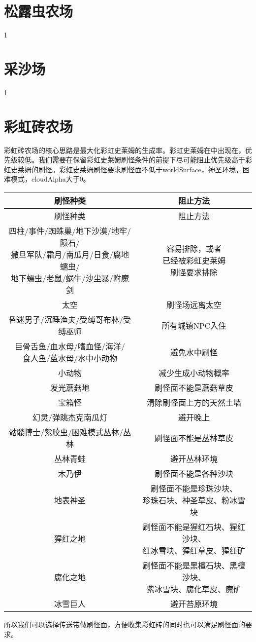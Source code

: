\section{松露虫农场}
1

\section{采沙场}
1

\section{彩虹砖农场}
彩虹砖农场的核心思路是最大化彩虹史莱姆的生成率。彩虹史莱姆在中出现在，优先级较低。我们需要在保留彩虹史莱姆刷怪条件的前提下尽可能阻止优先级高于彩虹史莱姆的刷怪。彩虹史莱姆刷怪要求刷怪面不低于worldSurface，神圣环境，困难模式，cloudAlpha大于0。
\begin{longtable}{|c|c|}
\hline
刷怪种类&阻止方法\\\hline
\endfirsthead
\hline
刷怪种类&阻止方法\\\hline
\endhead
\hline
\endfoot
\makecell{四柱/事件/蜘蛛巢/地下沙漠/地牢/陨石/\\ 撒旦军队/霜月/南瓜月/日食/腐地蠕虫/\\ 地下蠕虫/老鼠/蜗牛/沙尘暴/附魔剑}&\makecell{容易排除，或者\\ 已经被彩虹史莱姆\\ 刷怪要求排除}\\\hline
太空&刷怪场远离太空\\\hline
昏迷男子/沉睡渔夫/受缚哥布林/受缚巫师&所有城镇NPC入住\\\hline
\makecell{巨骨舌鱼/血水母/嗜血怪/海洋/\\ 食人鱼/蓝水母/水中小动物}&避免水中刷怪\\\hline
小动物&减少生成小动物概率\\\hline
发光蘑菇地&刷怪面不能是蘑菇草皮\\\hline
宝箱怪&清除刷怪面上方的天然土墙\\\hline
幻灵/弹跳杰克南瓜灯&避开晚上\\\hline
骷髅博士/紫胶虫/困难模式丛林/丛林&刷怪面不能是丛林草皮\\\hline
丛林青蛙&避开丛林环境\\\hline
木乃伊&刷怪面不能是各种沙块\\\hline
地表神圣&\makecell{刷怪面不能是珍珠沙块、\\ 珍珠石块、神圣草皮、粉冰雪块}\\\hline
猩红之地&\makecell{刷怪面不能是猩红石块、猩红沙块、\\ 红冰雪块、猩红草皮、猩红矿}\\\hline
腐化之地&\makecell{刷怪面不能是黑檀石块、黑檀沙块、\\ 紫冰雪块、腐化草皮、魔矿}\\\hline
冰雪巨人&避开苔原环境
\end{longtable}
所以我们可以选择传送带做刷怪面，方便收集彩虹砖的同时也可以满足刷怪面的要求。

